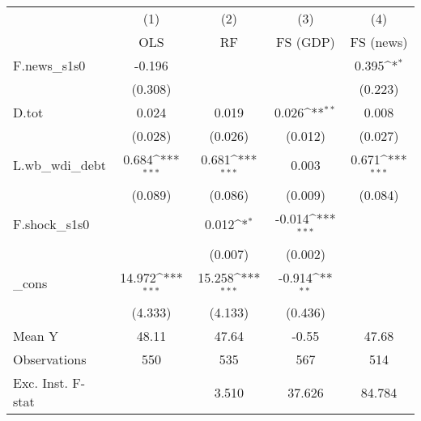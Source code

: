 {
\def\sym#1{\ifmmode^{#1}\else\(^{#1}\)\fi}
\begin{tabular}{l*{4}{c}}
\toprule
            &\multicolumn{1}{c}{(1)}&\multicolumn{1}{c}{(2)}&\multicolumn{1}{c}{(3)}&\multicolumn{1}{c}{(4)}\\
            &\multicolumn{1}{c}{OLS}&\multicolumn{1}{c}{RF}&\multicolumn{1}{c}{FS (GDP)}&\multicolumn{1}{c}{FS (news)}\\
\midrule
F.news\_s1s0 &      -0.196         &                     &                     &       0.395\sym{*}  \\
            &     (0.308)         &                     &                     &     (0.223)         \\
\addlinespace
D.tot       &       0.024         &       0.019         &       0.026\sym{**} &       0.008         \\
            &     (0.028)         &     (0.026)         &     (0.012)         &     (0.027)         \\
\addlinespace
L.wb\_wdi\_debt&       0.684\sym{***}&       0.681\sym{***}&       0.003         &       0.671\sym{***}\\
            &     (0.089)         &     (0.086)         &     (0.009)         &     (0.084)         \\
\addlinespace
F.shock\_s1s0&                     &       0.012\sym{*}  &      -0.014\sym{***}&                     \\
            &                     &     (0.007)         &     (0.002)         &                     \\
\addlinespace
\_cons      &      14.972\sym{***}&      15.258\sym{***}&      -0.914\sym{**} &                     \\
            &     (4.333)         &     (4.133)         &     (0.436)         &                     \\
\midrule
Mean Y      &       48.11         &       47.64         &       -0.55         &       47.68         \\
Observations&         550         &         535         &         567         &         514         \\
Exc. Inst. F-stat&                     &       3.510         &      37.626         &      84.784         \\
\bottomrule
\end{tabular}
}

